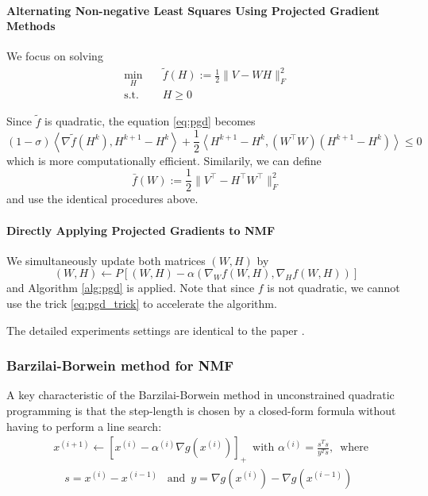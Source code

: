 \documentclass[conference,onecolumn,12pt]{IEEEtran}
\numberwithin{equation}{section}
\numberwithin{figure}{section}
\numberwithin{table}{section}
\theoremstyle{definition}
\begin{document}
\paragraph{Alternating Non-negative Least Squares Using Projected Gradient Methods}
We focus on solving
\begin{equation}
	\begin{split}
		\min_H &\quad \tilde{f}(H):=\frac{1}{2}\|V-WH\|_F^2\\
		\text{s.t.}&\quad H\geq 0
	\end{split}
\end{equation}

Since $\tilde{f}$ is quadratic, the equation \ref{eq:pgd} becomes
\begin{equation}
	\label{eq:pgd_trick}
	(1-\sigma)\left<\nabla \tilde{f}(H^k),H^{k+1}-H^k
	\right>+\frac{1}{2}\left<H^{k+1}-H^k, (W^\top W)(H^{k+1}-H^k)
	\right>\leq 0
\end{equation}
which is more computationally efficient. Similarily, we can define $$\bar{f}(W):=\frac{1}{2}\|V^\top - H^\top W^\top \|_F^2$$ and use the identical procedures above.
\paragraph{Directly Applying Projected Gradients to NMF}
We simultaneously update both matrices $(W,H)$ by
\begin{equation}
	(W,H)\gets P[(W,H)-\alpha(\nabla_W f(W,H),\nabla_H f(W,H))]
\end{equation}
and Algorithm \ref{alg:pgd} is applied. Note that since $f$ is not quadratic, we cannot use the trick \ref{eq:pgd_trick} to accelerate the algorithm.

The detailed experiments settings are identical to the paper \cite{6795860}.

\subsubsection{Barzilai-Borwein method for NMF}
A key characteristic of the Barzilai-Borwein method in unconstrained quadratic programming is that the step-length is chosen by a closed-form formula without having to perform a line search:
\begin{equation}
	\begin{split}
		&{x }^{(i+1)}\leftarrow \left[{x }^{(i)}-\alpha ^{(i)}\nabla g({x }^{(i)})\right]_{+}\,\text{ with}\,\,\alpha ^{(i)}=\frac{{s }^{T} s }{{y }^{T} s },\,\text{ where}\\&\quad  s ={x }^{(i)}-{x }^{(i-1)}\,\,\,\text{ and}\,\,\, y =\nabla g({x }^{(i)})-\nabla g({x }^{(i-1)})
	\end{split}
\end{equation}
\end{document}
